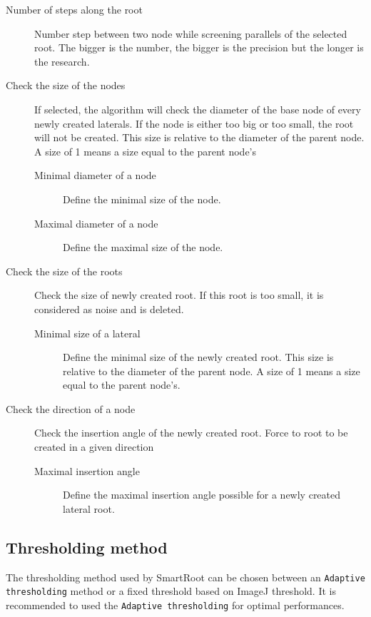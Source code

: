 \documentclass[a4paper,english,10pt]{report}
\begin{document}
\begin{description}
\item[Number of steps along the root] Number step between two node while screening parallels of the selected root. The bigger is the number, the bigger is the precision but the longer is the research.
\item[Check the size of the nodes] If selected, the algorithm will check the diameter of the base node of every newly created laterals. If the node is either too big or too small, the root will not be created. This size is relative to the diameter of the parent node. A size of 1 means a size equal to the parent node's
	\begin{description}
	\item[Minimal diameter of a node] Define the minimal size of the node. 
	\item[Maximal diameter of a node] Define the maximal size of the node.
	\end{description}
\item[Check the size of the roots] Check the size of newly created root. If this root is too small, it is considered as noise and is deleted.
	\begin{description}
	\item[Minimal size of a lateral] Define the minimal size of the newly created root. This size is relative to the diameter of the parent node. A size of 1 means a size equal to the parent node's.
	\end{description}
\item[Check the direction of a node] Check the insertion angle of the newly created root. Force to root to be created in a given direction
	\begin{description}
	\item[Maximal insertion angle] Define the maximal insertion angle possible for a newly created lateral root.
	\end{description}
\end{description}

\subsection{Thresholding method} 
\label{th_options}

The thresholding method used by SmartRoot can be chosen between an \verb|Adaptive thresholding| method or a fixed threshold based on ImageJ threshold. It is recommended to used the \verb|Adaptive thresholding| for optimal performances.
\end{document}

